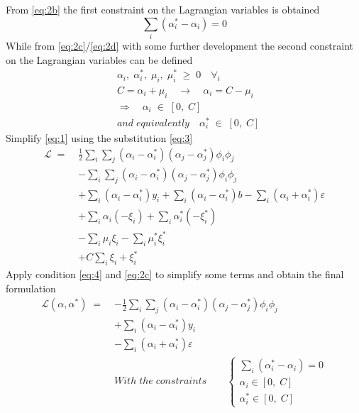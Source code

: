 \documentclass{article}
\newcommand{\Lagr}{\mathcal{L}}
\begin{document}
From \eqref{eq:2b} the first constraint on the Lagrangian variables is obtained
\begin{equation}\label{eq:4}
    \sum_i (\alpha_i^* - \alpha_i) = 0
\end{equation}
While from \eqref{eq:2c}/\eqref{eq:2d} with some further development the second constraint on the Lagrangian variables can be defined
\begin{equation}
    \begin{aligned}
        &\alpha_i,\;\alpha_i^*,\;\mu_i,\;\mu_i^*\;\geq\;0 \quad \forall_i \\
        &C = \alpha_i + \mu_i\quad\longrightarrow\quad\alpha_i = C - \mu_i \\
        &\Longrightarrow\quad\alpha_i\;\in\;[0,\;C]\\
        &and\;equivalently\quad\alpha_i^*\;\in\;[0,\;C]
    \end{aligned}
\end{equation}
Simplify \eqref{eq:1} using the substitution \eqref{eq:3}
\begin{equation}
    \begin{aligned}
        \Lagr\;=\;&\frac{1}{2} \sum_i \sum_j (\alpha_i - \alpha_i^*)(\alpha_j - \alpha_j^*)\phi_i\phi_j \\
        &-\sum_i \sum_j (\alpha_i - \alpha_i^*)(\alpha_j - \alpha_j^*)\phi_i\phi_j \\
        &+\sum_i (\alpha_i - \alpha_i^*)y_i
        +\sum_i (\alpha_i - \alpha_i^*)b
        -\sum_i (\alpha_i + \alpha_i^*)\varepsilon \\
        &+\sum_i \alpha_i(-\xi_i) + \sum_i\alpha_i^*(-\xi_i^*) \\
        &-\sum_i \mu_i\xi_i - \sum_i \mu_i^*\xi_i^* \\
        & +C\sum_i \xi_i + \xi_i^*
    \end{aligned}
\end{equation}
Apply condition \eqref{eq:4} and \eqref{eq:2c} to simplify some terms and obtain the final formulation
\begin{equation}
    \begin{aligned}
        \Lagr(\alpha, \alpha^*)\;=\;&-\frac{1}{2}\sum_i\sum_j (\alpha_i - \alpha_i^*)(\alpha_j - \alpha_j^*)\phi_i\phi_j \\
        &+ \sum_i (\alpha_i - \alpha_i^*)y_i \\
        &- \sum_i (\alpha_i + \alpha_i^*)\varepsilon \\
        &With\;the\;constraints\qquad
        \begin{cases}
            \sum_i (\alpha_i^* - \alpha_i) = 0 \\
            \alpha_i\in[0,\;C] \\
            \alpha_i^*\in[0,\;C]
        \end{cases}
    \end{aligned}
\end{equation}
\end{document}
